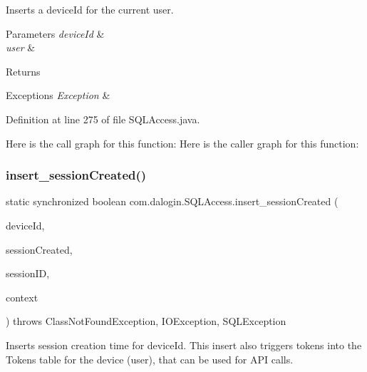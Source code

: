 Inserts a device\+Id for the current user.


\begin{DoxyParams}{Parameters}
{\em device\+Id} & \\
\hline
{\em user} & \\
\hline
\end{DoxyParams}
\begin{DoxyReturn}{Returns}

\end{DoxyReturn}

\begin{DoxyExceptions}{Exceptions}
{\em Exception} & \\
\hline
\end{DoxyExceptions}


Definition at line 275 of file S\+Q\+L\+Access.\+java.

Here is the call graph for this function\+:
Here is the caller graph for this function\+:
\mbox{\label{classcom_1_1dalogin_1_1_s_q_l_access_afbe8ec045fac97fdc76c62648c9bb648}} 
\subsubsection{\texorpdfstring{insert\+\_\+session\+Created()}{insert\_sessionCreated()}}
{\footnotesize\ttfamily static synchronized boolean com.\+dalogin.\+S\+Q\+L\+Access.\+insert\+\_\+session\+Created (\begin{DoxyParamCaption}\item[{String}]{device\+Id,  }\item[{long}]{session\+Created,  }\item[{String}]{session\+ID,  }\item[{Servlet\+Context}]{context }\end{DoxyParamCaption}) throws Class\+Not\+Found\+Exception, I\+O\+Exception, S\+Q\+L\+Exception\hspace{0.3cm}{\ttfamily [static]}}

Inserts session creation time for device\+Id. This insert also triggers tokens into the Tokens table for the device (user), that can be used for A\+PI calls.


